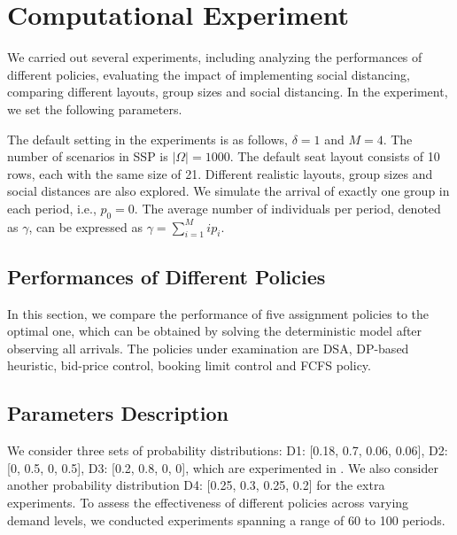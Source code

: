 \section{Computational Experiment}\label{sec_result}
We carried out several experiments, including analyzing the performances of different policies, evaluating the impact of implementing social distancing, comparing different layouts, group sizes and social distancing. In the experiment, we set the following parameters. 

The default setting in the experiments is as follows, $\delta =1$ and $M =4$. The number of scenarios in SSP is $|\Omega| = 1000$. The default seat layout consists of 10 rows, each with the same size of 21. Different realistic layouts, group sizes and social distances are also explored. We simulate the arrival of exactly one group in each period, i.e., $p_0 = 0$. The average number of individuals per period, denoted as $\gamma$, can be expressed as $\gamma = \sum_{i=1}^{M} i p_i$.


\subsection{Performances of Different Policies}
In this section, we compare the performance of five assignment policies to the optimal one, which can be obtained by solving the deterministic model after observing all arrivals. The policies under examination are DSA, DP-based heuristic, bid-price control, booking limit control and FCFS policy.

\subsection*{Parameters Description}
We consider three sets of probability distributions: D1: [0.18, 0.7, 0.06, 0.06], D2: [0, 0.5, 0, 0.5], D3: [0.2, 0.8, 0, 0], which are experimented in \cite{blom2022filling}. We also consider another probability distribution D4: [0.25, 0.3, 0.25, 0.2] for the extra experiments. To assess the effectiveness of different policies across varying demand levels, we conducted experiments spanning a range of 60 to 100 periods. 


